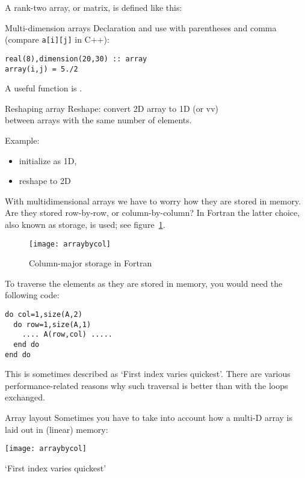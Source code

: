 A rank-two array, or matrix, is defined like this:
\begin{block}{Multi-dimension arrays}
  \label{sl:farray-2d}
  Declaration and use with parentheses and comma\\
  (compare \lstinline{a[i][j]} in C++):
\begin{lstlisting}
real(8),dimension(20,30) :: array
array(i,j) = 5./2
\end{lstlisting}
\end{block}

A useful function is .

\begin{block}{Reshaping array}
  \label{sl:finit2d}
  Reshape: convert 2D array to 1D (or vv)\\
  between arrays with the same number of elements.

  Example: 
  \begin{itemize}
  \item initialize as 1D,
  \item reshape to 2D
  \end{itemize}

\end{block}

With multidimensional arrays we have to worry how they are stored in
memory. Are they stored row-by-row, or column-by-column? In Fortran
the latter choice, also known as  storage,
is used; see figure~\ref{fig:column-major}.

\begin{figure}[ht]
  \texttt{[image: arraybycol]}
  \caption{Column-major storage in Fortran}
  \label{fig:column-major}
\end{figure}

To traverse the elements as they are stored in memory, you would need
the following code:
\begin{lstlisting}
do col=1,size(A,2)
  do row=1,size(A,1)
    .... A(row,col) .....
  end do
end do
\end{lstlisting}
This is sometimes described as `First index varies quickest'.
There are various performance-related reasons why such traversal
is better than with the loops exchanged.

\begin{slide}{Array layout}
  \label{sl:farray-layout}
  Sometimes you have to take into account how a multi-D array
  is laid out in (linear) memory:

  \texttt{[image: arraybycol]}

  `First index varies quickest'
\end{slide}

